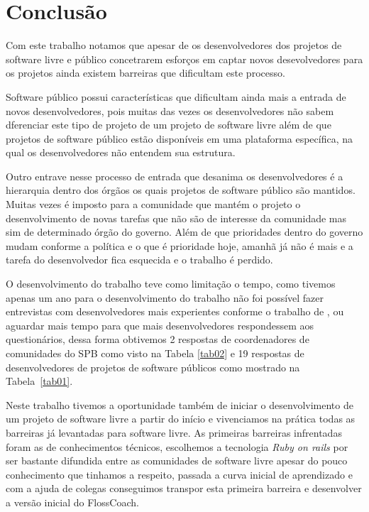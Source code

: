 \chapter{Conclusão}
\label{conclusao}

Com este trabalho notamos que apesar de os desenvolvedores dos projetos de software
livre e público concetrarem esforços em captar novos desevolvedores para os 
projetos ainda existem barreiras que dificultam este processo. 

Software público possui características que dificultam ainda mais a entrada de 
novos desenvolvedores, pois muitas das vezes os desenvolvedores não sabem 
dferenciar este tipo de projeto de um projeto de software livre além de que
projetos de software público estão disponíveis em uma plataforma específica,
na qual os desenvolvedores não entendem sua estrutura.

Outro entrave nesse processo de entrada que desanima os desenvolvedores
é a hierarquia dentro dos órgãos os quais projetos de software público são 
mantidos. Muitas vezes é imposto para a comunidade que mantém o projeto
o desenvolvimento de novas tarefas que não são de interesse da comunidade
mas sim de determinado órgão do governo. Além de que prioridades dentro do
governo mudam conforme a política e o que é prioridade hoje, amanhã já não é mais
e a tarefa do desenvolvedor fica esquecida e o trabalho é perdido.

O desenvolvimento do trabalho teve como limitação o tempo, como tivemos apenas um ano
para o desenvolvimento do trabalho não foi possível fazer entrevistas com desenvolvedores mais
experientes conforme o trabalho de , ou aguardar mais 
tempo para que mais desenvolvedores respondessem aos questionários,
dessa forma obtivemos 2 respostas de coordenadores de comunidades do SPB como visto na Tabela
\ref{tab02} e 19 respostas de desenvolvedores de projetos de software públicos como mostrado
na Tabela~\ref{tab01}.

Neste trabalho tivemos a oportunidade também de iniciar o desenvolvimento de um
projeto de software livre a partir do início e vivenciamos na prática todas as barreiras
já levantadas para software livre. As primeiras barreiras infrentadas foram as de
conhecimentos técnicos, escolhemos a tecnologia \textit{Ruby on rails} por ser
bastante difundida entre as comunidades de software livre apesar do pouco conhecimento
que tinhamos a respeito, passada a curva inicial de aprendizado e com a ajuda de 
colegas conseguimos transpor esta primeira barreira e desenvolver a versão inicial 
do FlossCoach.

